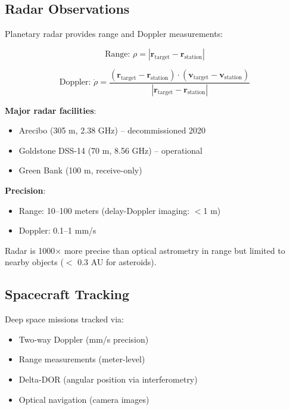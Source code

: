 \subsection{Radar Observations}

Planetary radar provides range and Doppler measurements:

\begin{equation}
    \text{Range: } \rho = |\mathbf{r}_{\text{target}} - \mathbf{r}_{\text{station}}|
\end{equation}

\begin{equation}
    \text{Doppler: } \dot{\rho} = \frac{(\mathbf{r}_{\text{target}} - \mathbf{r}_{\text{station}}) \cdot (\mathbf{v}_{\text{target}} - \mathbf{v}_{\text{station}})}{|\mathbf{r}_{\text{target}} - \mathbf{r}_{\text{station}}|}
\end{equation}

\textbf{Major radar facilities}:
\begin{itemize}
    \item Arecibo (305 m, 2.38 GHz) -- decommissioned 2020
    \item Goldstone DSS-14 (70 m, 8.56 GHz) -- operational
    \item Green Bank (100 m, receive-only)
\end{itemize}

\textbf{Precision}:
\begin{itemize}
    \item Range: 10--100 meters (delay-Doppler imaging: $<$1 m)
    \item Doppler: 0.1--1 mm/s
\end{itemize}

Radar is 1000$\times$ more precise than optical astrometry in range but limited to nearby objects ($<$ 0.3 AU for asteroids).

\subsection{Spacecraft Tracking}

Deep space missions tracked via:
\begin{itemize}
    \item Two-way Doppler (mm/s precision)
    \item Range measurements (meter-level)
    \item Delta-DOR (angular position via interferometry)
    \item Optical navigation (camera images)
\end{itemize}

